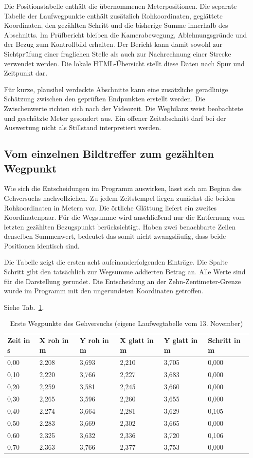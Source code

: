 Die Positionstabelle enthält die übernommenen Meterpositionen. Die separate Tabelle der Laufwegpunkte enthält zusätzlich Rohkoordinaten, geglättete Koordinaten, den gezählten Schritt und die bisherige Summe innerhalb des Abschnitts. Im Prüfbericht bleiben die Kamerabewegung, Ablehnungsgründe und der Bezug zum Kontrollbild erhalten. Der Bericht kann damit sowohl zur Sichtprüfung einer fraglichen Stelle als auch zur Nachrechnung einer Strecke verwendet werden. Die lokale HTML-Übersicht stellt diese Daten nach Spur und Zeitpunkt dar.

Für kurze, plausibel verdeckte Abschnitte kann eine zusätzliche geradlinige Schätzung zwischen den geprüften Endpunkten erstellt werden. Die Zwischenwerte richten sich nach der Videozeit. Die Wegbilanz weist beobachtete und geschätzte Meter gesondert aus. Ein offener Zeitabschnitt darf bei der Auswertung nicht als Stillstand interpretiert werden.

\subsection{Vom einzelnen Bildtreffer zum gezählten Wegpunkt}
Wie sich die Entscheidungen im Programm auswirken, lässt sich am Beginn des Gehversuchs nachvollziehen. Zu jedem Zeitstempel liegen zunächst die beiden Rohkoordinaten in Metern vor. Die örtliche Glättung liefert ein zweites Koordinatenpaar. Für die Wegsumme wird anschließend nur die Entfernung vom letzten gezählten Bezugspunkt berücksichtigt. Haben zwei benachbarte Zeilen denselben Summenwert, bedeutet das somit nicht zwangsläufig, dass beide Positionen identisch sind.

Die Tabelle zeigt die ersten acht aufeinanderfolgenden Einträge. Die Spalte Schritt gibt den tatsächlich zur Wegsumme addierten Betrag an. Alle Werte sind für die Darstellung gerundet. Die Entscheidung an der Zehn-Zentimeter-Grenze wurde im Programm mit den ungerundeten Koordinaten getroffen.

Siehe Tab.~\ref{tab:em-punkte}.
\begin{table}[htbp]\centering\caption{Erste Wegpunkte des Gehversuchs (eigene Laufwegtabelle vom 13. November)}\label{tab:em-punkte}
\begin{tabular}{@{}llllll@{}}\toprule Zeit in s & X roh in m & Y roh in m & X glatt in m & Y glatt in m & Schritt in m\\\midrule
0,00 & 2,208 & 3,693 & 2,210 & 3,705 & 0,000\\
0,10 & 2,220 & 3,766 & 2,227 & 3,683 & 0,000\\
0,20 & 2,259 & 3,581 & 2,245 & 3,660 & 0,000\\
0,30 & 2,265 & 3,596 & 2,260 & 3,655 & 0,000\\
0,40 & 2,274 & 3,664 & 2,281 & 3,629 & 0,105\\
0,50 & 2,283 & 3,669 & 2,302 & 3,665 & 0,000\\
0,60 & 2,325 & 3,632 & 2,336 & 3,720 & 0,106\\
0,70 & 2,363 & 3,766 & 2,377 & 3,753 & 0,000\\\bottomrule\end{tabular}\end{table}

